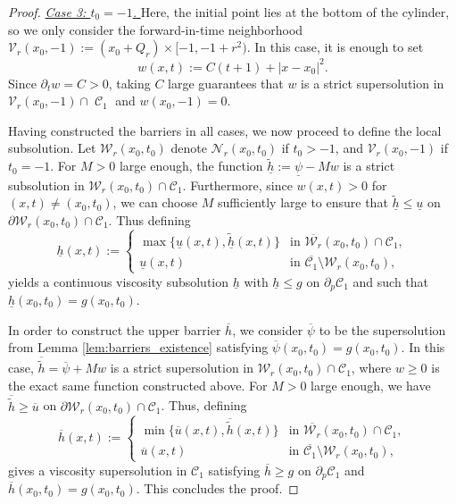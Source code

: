 \documentclass[12pt]{article}
\numberwithin{Theorem}{section}
\theoremstyle{definition}
\theoremstyle{remark}
\numberwithin{equation}{section}
\DeclareMathOperator{\C}{\mathcal{C}}
\begin{document}
\begin{proof}
      \underline{\textit{Case 3: $t_0 =-1$. }} 
      Here, the initial point lies at the bottom of the cylinder, so we only consider the forward-in-time neighborhood $\mathcal{V}_r(x_0, -1) := (x_0 + Q_r) \times [-1, -1+r^2)$. In this case, it is enough to set
    $$ w(x,t) := C(t+1) +|x - x_0|^2. $$
     Since $\partial_t w = C> 0$, taking $C$ large guarantees that $w$ is a strict supersolution in $\mathcal{V}_r(x_0, -1) \cap \C_1$ and $w(x_0,-1)=0$.

\medskip
Having constructed the barriers in all cases, we now proceed to define the local subsolution. Let $\mathcal{W}_r(x_0,t_0)$ denote $\mathcal{N}_r(x_0, t_0)$ if $t_0 > -1$, and $\mathcal{V}_r(x_0, -1)$ if $t_0 = -1$.
For  $M > 0$ large enough, the function $\underline{\tilde{h}} := \underline{\psi} - Mw$ is a strict subsolution in $\mathcal{W}_r(x_0,t_0) \cap \mathcal{C}_1$. Furthermore, since $w(x,t) > 0$ for $(x,t)\neq (x_0,t_0)$, we can choose $M$ sufficiently large to ensure that $\underline{\tilde{h}} \le \underline{u}$  on $\partial \mathcal{W}_r(x_0,t_0) \cap \mathcal{C}_1$.
Thus defining
$$
\underline{h}(x,t) := \begin{cases} \max\{\underline{u}(x,t), \underline{\tilde{h}}(x,t)\} & \text{in } \overline{\mathcal{W}_r}(x_0,t_0) \cap \mathcal{C}_1, \\ \underline{u}(x,t) & \text{in } \overline{\mathcal{C}_1} \setminus \mathcal{W}_r(x_0,t_0), \end{cases}
$$
yields a continuous viscosity subsolution $\underline{h}$ with $\underline{h}\leq g$ on $\partial_p \mathcal{C}_1$ and such that $\underline{h}(x_0,t_0)=g(x_0,t_0)$.

In order to construct the upper barrier $\overline{h}$, we consider $\overline{\psi}$ to be the supersolution from Lemma \ref{lem:barriers_existence} satisfying $\overline{\psi}(x_0,t_0) = g(x_0,t_0)$. In this case, $\overline{\tilde{h}} = \overline{\psi} + Mw$ is a strict supersolution in $\mathcal{W}_r(x_0,t_0) \cap \mathcal{C}_1$, where $w \ge 0$ is the exact same function constructed above. For $M>0$ large enough, we have $\overline{\tilde{h}} \ge \overline{u}$ on $\partial \mathcal{W}_r(x_0,t_0) \cap \mathcal{C}_1$. Thus, defining
$$
\overline{h}(x,t) := \begin{cases} \min\{\overline{u}(x,t), \overline{\tilde{h}}(x,t)\} & \text{in } \overline{\mathcal{W}_r}(x_0,t_0) \cap \mathcal{C}_1, \\ \overline{u}(x,t) & \text{in } \overline{\mathcal{C}_1} \setminus \mathcal{W}_r(x_0,t_0), \end{cases}
$$
gives a viscosity supersolution in $\mathcal{C}_1$ satisfying $\overline{h} \ge g$ on $\partial_p \mathcal{C}_1$ and $\overline{h}(x_0,t_0) = g(x_0,t_0)$. This concludes the proof.

     
\end{proof}
\end{document}
